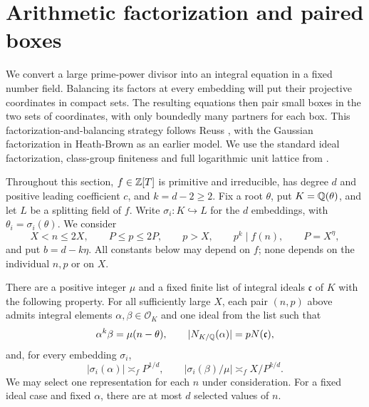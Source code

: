 \section{Arithmetic factorization and paired boxes}
\label{sec:arithmetic-boxes}

We convert a large prime-power divisor into an integral equation in a
fixed number field.  Balancing its factors at every embedding will put
their projective coordinates in compact sets.  The resulting equations
then pair small boxes in the two sets of coordinates, with only boundedly
many partners for each box.
This factorization-and-balancing strategy follows Reuss
\cite[Section~3]{Reuss2015PowerFree}, with the Gaussian factorization
in Heath-Brown \cite[Sections~2--4]{HeathBrown2012Squarefree} as an
earlier model. We use the standard ideal factorization, class-group
finiteness and full logarithmic unit lattice from
\cite[Theorems~3.7, 4.4 and~5.9]{milne2020ant}.

Throughout this section, $f\in\mathbb Z[T]$ is primitive and irreducible, has
degree $d$ and positive leading coefficient $c$, and $k=d-2\ge2$.
Fix a root $\theta$, put $K=\mathbb Q(\theta)$, and let $L$ be a splitting field
of $f$.  Write $\sigma_i:K\hookrightarrow L$ for the $d$ embeddings,
with $\theta_i=\sigma_i(\theta)$.  We consider
\[
 X<n\le2X,\qquad P\le p\le2P,\qquad p>X,\qquad p^k\mid f(n),
 \qquad P=X^\eta,
\]
and put $b=d-k\eta$.  All constants below may depend on $f$; none
depends on the individual $n,p$ or on $X$.

\begin{lemma}\label{lem:balanced-factorization}
There are a positive integer $\mu$ and a fixed finite list of integral
ideals $\mathfrak c$ of $K$ with the following property.  For all
sufficiently large $X$, each pair $(n,p)$ above admits integral elements
$\alpha,\beta\in\mathcal O_K$ and one ideal from the list such that
\begin{equation}\label{eq:arithmetic-factorization}
 \alpha^k\beta=\mu(n-\theta),\qquad
 |N_{K/\mathbb Q}(\alpha)|=pN(\mathfrak c),
\end{equation}
and, for every embedding $\sigma_i$,
\begin{equation}\label{eq:arithmetic-balanced-sizes}
 |\sigma_i(\alpha)|\asymp_f P^{1/d},\qquad
 |\sigma_i(\beta)/\mu|\asymp_f X/P^{k/d}.
\end{equation}
We may select one representation for each $n$ under consideration.
For a fixed ideal case and fixed $\alpha$, there are at most $d$
selected values of $n$.
\end{lemma}

